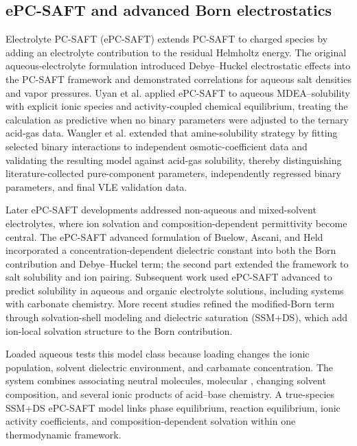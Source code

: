 \subsection{ePC-SAFT and advanced Born electrostatics}
Electrolyte PC-SAFT (ePC-SAFT) extends PC-SAFT to charged species by adding an electrolyte contribution to the residual Helmholtz energy.  The original aqueous-electrolyte formulation introduced Debye--Huckel electrostatic effects into the PC-SAFT framework and demonstrated correlations for aqueous salt densities and vapor pressures\cite{Cameretti2005}.  Uyan et al. applied ePC-SAFT to aqueous MDEA--\COtwo solubility with explicit ionic species and activity-coupled chemical equilibrium, treating the calculation as predictive when no binary parameters were adjusted to the ternary acid-gas data\cite{Uyan2015}.  Wangler et al. extended that amine-solubility strategy by fitting selected binary interactions to independent osmotic-coefficient data and validating the resulting model against acid-gas solubility, thereby distinguishing literature-collected pure-component parameters, independently regressed binary parameters, and final VLE validation data\cite{Wangler2018}.

Later ePC-SAFT developments addressed non-aqueous and mixed-solvent electrolytes, where ion solvation and composition-dependent permittivity become central.  The ePC-SAFT advanced formulation of Buelow, Ascani, and Held incorporated a concentration-dependent dielectric constant into both the Born contribution and Debye--Huckel term\cite{Bulow2020}; the second part extended the framework to salt solubility and ion pairing\cite{Bulow2021}.  Subsequent work used ePC-SAFT advanced to predict \COtwo solubility in aqueous and organic electrolyte solutions, including systems with carbonate chemistry\cite{Schick2023}.  More recent studies refined the modified-Born term through solvation-shell modeling and dielectric saturation (SSM+DS), which add ion-local solvation structure to the Born contribution\cite{Rueben2024,Figiel2025}.

Loaded aqueous \MEA tests this model class because \COtwo loading changes the ionic population, solvent dielectric environment, and carbamate concentration.  The system combines associating neutral molecules, molecular \COtwo, changing solvent composition, and several ionic products of acid--base chemistry.  A true-species SSM+DS ePC-SAFT model links phase equilibrium, reaction equilibrium, ionic activity coefficients, and composition-dependent solvation within one thermodynamic framework.

